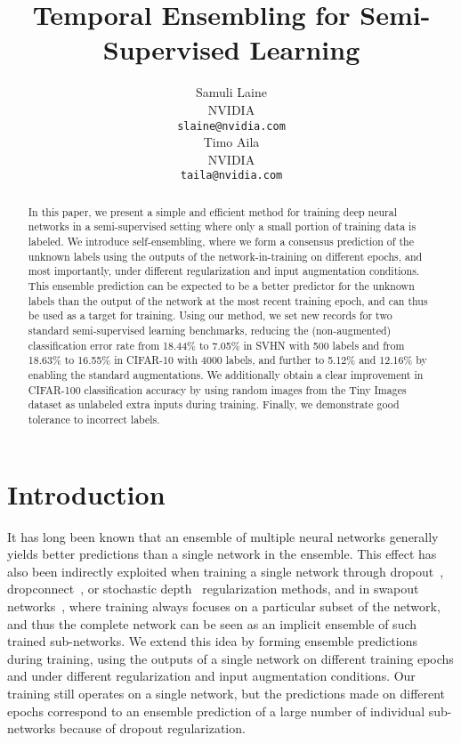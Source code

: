 \documentclass{article}
\title{Temporal Ensembling for Semi-Supervised Learning}
\author{Samuli Laine\\NVIDIA\\\texttt{slaine@nvidia.com}\\\And Timo Aila\\NVIDIA\\\texttt{taila@nvidia.com}}
\newcommand{\ds}[1]{\mbox{#1}}
\begin{document}
{\flushleft\maketitle}
\ifx\headrulewidth\undefined\else\thispagestyle{fancy}\fi

\begin{abstract} 
In this paper, we present a simple and efficient method for training deep neural networks in
a semi-supervised setting where only a small portion of training data is
labeled. We introduce self-ensembling, where we form a consensus
prediction of the unknown labels using the outputs of the
network-in-training on different epochs, and most importantly, under different
regularization and input augmentation conditions. This ensemble prediction
can be expected to be a better predictor for the unknown labels than the 
output of the network at the most recent training epoch, and can thus be
used as a target for training. 
Using our method, we set new records for two standard semi-supervised
learning benchmarks, reducing the (non-augmented) classification error rate
from 18.44\% to 7.05\% in \ds{SVHN} with 500 labels and from 18.63\% to 16.55\% in \ds{CIFAR-10} with 4000 labels, 
and further to 5.12\% and 12.16\% by enabling the standard augmentations.
We additionally obtain a clear improvement in \ds{CIFAR-100} classification accuracy by using random images from the Tiny Images dataset as unlabeled extra inputs during training.
Finally, we demonstrate good tolerance to incorrect labels.
\end{abstract}

\section{Introduction}
\label{sec:intro}

It has long been known that an ensemble of multiple neural networks generally yields
better predictions than a single network in the ensemble. This effect has also been
indirectly exploited when training a single network through dropout~\citep{srivastava2014}, dropconnect~\citep{dropconnect}, or stochastic depth~\citep{stochdepth} 
regularization methods, and in swapout networks~\citep{swapout}, where training always focuses on a
particular subset of the network, and thus the complete network can be seen as an
implicit ensemble of such trained sub-networks. We extend this idea by forming
ensemble predictions during training, using the outputs of
a single network on different training epochs and under different regularization
and input augmentation conditions. Our training still operates on a single network,
but the predictions made on different epochs correspond to an ensemble prediction of
a large number of individual sub-networks because of dropout regularization.
\end{document}
